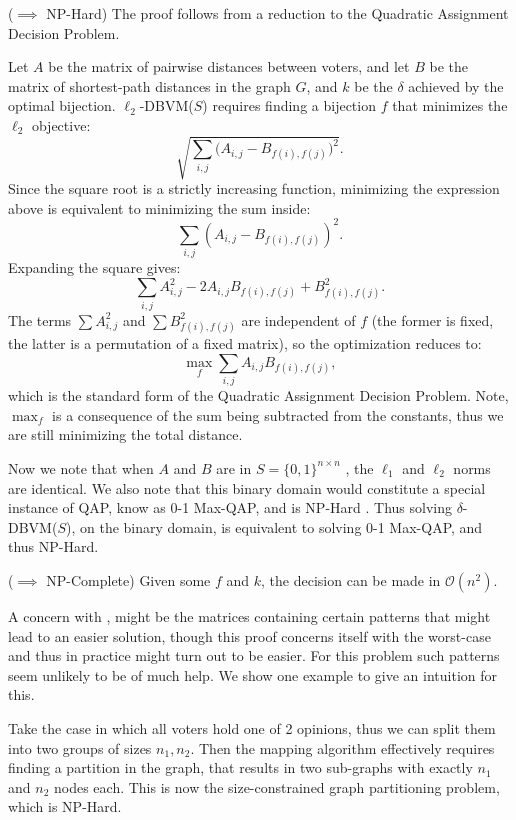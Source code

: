 \begin{proofc}{}
 ($\implies$ NP-Hard) The proof follows from a reduction to the Quadratic Assignment Decision Problem.

  Let $A$ be the matrix of pairwise distances between voters, and let $B$ be the matrix of shortest-path distances in the graph $G$, and $k$ be the $\delta$ achieved by the optimal bijection. $\ell_2$-DBVM($S$) requires finding a bijection $f$ that minimizes the $\ell_2$ objective:
  $$
    \sqrt{\sum_{i,j} \bigl(A_{i,j} - B_{f(i),f(j)}\bigr)^2}.
  $$
  Since the square root is a strictly increasing function, minimizing the expression above is equivalent to minimizing the sum inside:
  $$
    \sum_{i,j} (A_{i,j} - B_{f(i),f(j)})^2.
  $$
  Expanding the square gives:
  $$
    \sum_{i,j} A_{i,j}^2 - 2 A_{i,j} B_{f(i),f(j)} + B_{f(i),f(j)}^2.
  $$
  The terms $\sum A_{i,j}^2$ and $\sum B_{f(i),f(j)}^2$ are independent of $f$ (the former is fixed, the latter is a permutation of a fixed matrix), so the optimization reduces to:
  $$
    \max_f \sum_{i,j} A_{i,j} B_{f(i),f(j)},
  $$
  which is the standard form of the Quadratic Assignment Decision Problem. Note, $\max_f$ is a consequence of the sum being subtracted from the constants, thus we are still minimizing the total distance.

  Now we note that when $A$ and $B$ are in $S= \{0,1\}^{n \times n}$ , the
  $\ell_1$ and $\ell_2$ norms are identical. We also note that this binary
  domain would constitute a special instance of QAP, know as 0-1 Max-QAP, and
  is NP-Hard \cite{nagarajanMaximumQuadraticAssignment}. Thus solving
  $\delta$-DBVM($S$), on the binary domain, is equivalent to solving 0-1
  Max-QAP, and thus NP-Hard.~\checkmark


  ($\implies$ NP-Complete) Given some $f$ and $k$, the decision can be made in $\mathcal{O}(n^2)$.~\checkmark


\end{proofc}

A concern with , might be the matrices
containing certain patterns that might lead to an easier solution, though
this proof concerns itself with the worst-case and thus
in practice might turn out to be easier. For this problem such patterns seem
unlikely to be of much help. We show one example to give an intuition for this.

Take the case in which all voters hold one of 2 opinions, thus we can split
them into two groups of sizes $n_1, n_2$. Then the mapping algorithm
effectively requires finding a partition in the graph, that results in two
sub-graphs with exactly $n_1$ and $n_2$ nodes each. This is now the
size-constrained graph partitioning problem, which is NP-Hard. 

